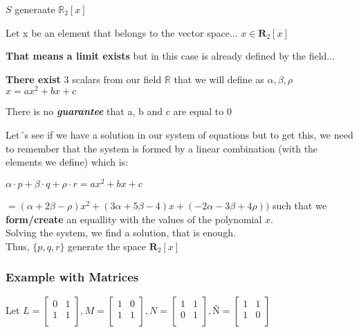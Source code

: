 \documentclass{article}
\begin{document}
\(S\) generaate \(\mathbb{R}_2[x]\)

Let x be an element that belongs to the vector space... \(x \in \mathbf{R}_2[x]\)

\textbf{That means a limit exists} but in this case is already defined by the field...

\textbf{There exist} 3 scalars from our field \(\mathbb{R}\) that we will define as \(\alpha, \beta, \rho\)
\\

\(x=ax^2+bx+c\)

There is no \textbf{\textit{guarantee}} that a, b and c are equal to 0

Let´s see if we have a solution in our system of equations but to get this, we need to remember that the system is formed by a linear combination (with the elements we define) which is:

\(\alpha \cdot p + \beta \cdot q + \rho \cdot r = ax^2 + bx +c\)

\(= (\alpha+2\beta-\rho)x^2 + (3\alpha + 5\beta -4)x + (-2\alpha -3\beta +4\rho))\) such that we \textbf{form/create} an equallity with the values of the polynomial \(x\).
\\

Solving the system, we find a solution, that is enough.
\\

Thus, \(\{p,q,r\}\) generate the space \(\mathbf{R}_2[x]\)

\subsubsection*{Example with Matrices}

Let \(L =
\begin{bmatrix}
0 & 1 \\
1 & 1 \\
\end{bmatrix}, M =
\begin{bmatrix}
1 & 0 \\
1 & 1 \\
\end{bmatrix}, N =
\begin{bmatrix}
1 & 1 \\
0 & 1 \\
\end{bmatrix}, Ñ = 
\begin{bmatrix}
    1 & 1 \\
    1 & 0 \\
\end{bmatrix}
\)
\\
\end{document}
